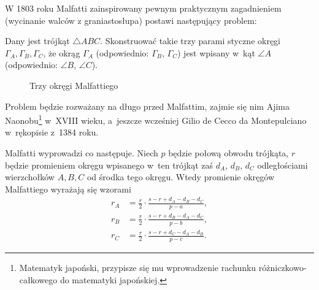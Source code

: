 %

W 1803 roku Malfatti \cite{malfatti_1803} zainspirowany pewnym praktycznym zagadnieniem (wycinanie walców z graniastosłupa) postawi następujący problem:
%

\begin{problem}
	\label{malfatti_problem}
	Dany jest trójkąt $\triangle ABC$.
	Skonstruować takie trzy parami styczne okręgi $\Gamma_A, \Gamma_B, \Gamma_C$, że okrąg $\Gamma_A$ (odpowiednio: $\Gamma_B$, $\Gamma_C$) jest wpisany w~kąt $\angle A$ (odpowiednio: $\angle B$, $\angle C$).
\end{problem}

\begin{figure}[H]
\begin{center}
\end{center}
\caption{Trzy okręgi Malfattiego}
\end{figure}

Problem będzie rozważany na długo przed Malfattim, zajmie się nim Ajima Naonobu\footnote{Matematyk japoński, przypisze się mu wprowadzenie rachunku różniczkowo-całkowego do matematyki japońskiej.} w~XVIII wieku, a~jeszcze wcześniej Gilio de Cecco da Montepulciano w~rękopisie z~1384 roku.
%
%

Malfatti wyprowadzi co następuje.
Niech $p$ będzie połową obwodu trójkąta, $r$ będzie promieniem okręgu wpisanego w~ten trójkąt zaś $d_A$, $d_B$, $d_C$ odległościami wierzchołków $A, B, C$ od środka tego okręgu.
Wtedy promienie okręgów Malfattiego wyrażają się wzorami
\begin{align}
	r_A & = \frac r 2 \cdot {\frac {s-r+d_A-d_B-d_C}{p-a}}, \\
	r_B & = \frac r 2 \cdot {\frac {s-r+d_B-d_A-d_C}{p-b}}, \\
	r_C & = \frac r 2 \cdot {\frac {s-r+d_C-d_A-d_B}{p-c}}.
\end{align}

